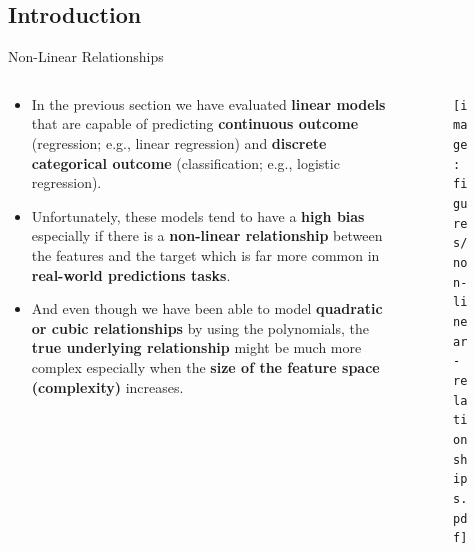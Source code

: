 \documentclass[document.tex]{subfiles}
\begin{document}
    \subsection{Introduction}
    
    \begin{frame}{Non-Linear Relationships}
        \begin{columns}
            \begin{column}{0.6\textwidth}
                \begin{itemize}
                    \item In the previous section we have evaluated \textbf{linear models} that are capable of predicting \textbf{continuous outcome} (regression; e.g., linear regression) and \textbf{discrete categorical outcome} (classification; e.g., logistic regression).
                    \item Unfortunately, these models tend to have a \textbf{high bias} especially if there is a \textbf{non-linear relationship} between the features and the target which is far more common in \textbf{real-world predictions tasks}.
                    \item And even though we have been able to model \textbf{quadratic or cubic relationships} by using the polynomials, the \textbf{true underlying relationship} might be much more complex especially when the \textbf{size of the feature space (complexity)} increases.
                \end{itemize}
            \end{column}
            \begin{column}{0.4\textwidth}
                \begin{figure}
                    \label{fig:non-linear-relationships}
                    \texttt{[image: figures/non-linear-relationships.pdf]}
                \end{figure}
            \end{column}
        \end{columns}
    \end{frame}
\end{document}

